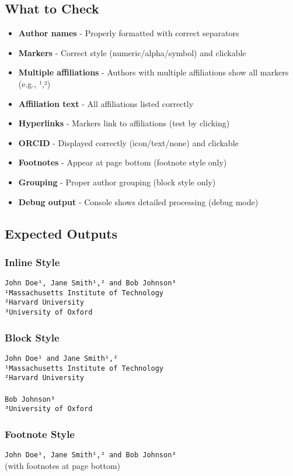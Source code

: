 \documentclass{article}
\begin{document}
\subsection*{What to Check}

\begin{itemize}
\item \textbf{Author names} - Properly formatted with correct separators
\item \textbf{Markers} - Correct style (numeric/alpha/symbol) and clickable
\item \textbf{Multiple affiliations} - Authors with multiple affiliations show all markers (e.g., ¹,²)
\item \textbf{Affiliation text} - All affiliations listed correctly
\item \textbf{Hyperlinks} - Markers link to affiliations (test by clicking)
\item \textbf{ORCID} - Displayed correctly (icon/text/none) and clickable
\item \textbf{Footnotes} - Appear at page bottom (footnote style only)
\item \textbf{Grouping} - Proper author grouping (block style only)
\item \textbf{Debug output} - Console shows detailed processing (debug mode)
\end{itemize}

\subsection*{Expected Outputs}

\subsubsection*{Inline Style}
\texttt{John Doe¹, Jane Smith¹,² and Bob Johnson³}\\
\texttt{¹Massachusetts Institute of Technology}\\
\texttt{²Harvard University}\\
\texttt{³University of Oxford}

\subsubsection*{Block Style}
\texttt{John Doe¹ and Jane Smith¹,²}\\
\texttt{¹Massachusetts Institute of Technology}\\
\texttt{²Harvard University}\\
\\
\texttt{Bob Johnson³}\\
\texttt{³University of Oxford}

\subsubsection*{Footnote Style}
\texttt{John Doe¹, Jane Smith¹,² and Bob Johnson³}\\
(with footnotes at page bottom)
\end{document}
